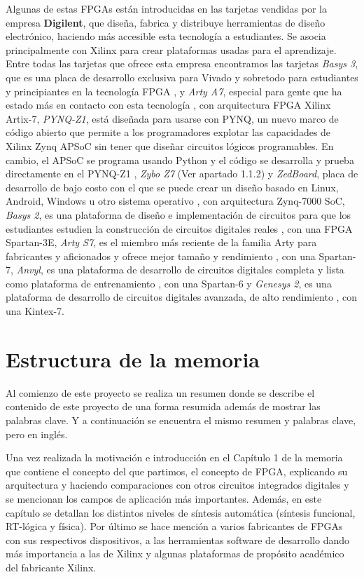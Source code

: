 Algunas de estas FPGAs están introducidas en las tarjetas vendidas por la empresa \textbf{Digilent}, que 
diseña, fabrica y distribuye herramientas de diseño electrónico, haciendo más accesible esta tecnología 
a estudiantes. Se asocia principalmente con Xilinx para crear plataformas usadas para el aprendizaje. Entre todas las 
tarjetas que ofrece esta empresa encontramos las tarjetas \textit{Basys 3}, que es una placa de desarrollo exclusiva para Vivado y sobretodo para 
estudiantes y principiantes en la tecnología FPGA \cite{basys}, y \textit{Arty A7}, especial para gente que ha estado más en contacto con esta tecnología \cite{arty}, 
con arquitectura FPGA Xilinx Artix-7, \textit{PYNQ-Z1}, está diseñada para usarse con PYNQ, un nuevo marco de código abierto que permite a los programadores explotar las 
capacidades de Xilinx Zynq APSoC sin tener que diseñar circuitos lógicos programables. En cambio, el APSoC se programa usando Python y el código se desarrolla y prueba 
directamente en el PYNQ-Z1 \cite{pynq1}, \textit{Zybo Z7} (Ver apartado 1.1.2) y \textit{ZedBoard}, placa de desarrollo de bajo costo con el que se puede crear 
un diseño basado en Linux, Android, Windows u otro sistema operativo \cite{zed}, con arquitectura Zynq-7000 SoC, \textit{Basys 2}, es una plataforma de diseño e 
implementación de circuitos para que los estudiantes estudien la construcción de circuitos digitales reales \cite{basys2}, con una FPGA Spartan-3E, 
\textit{Arty S7}, es el miembro más reciente de la familia Arty para fabricantes y aficionados y ofrece mejor tamaño y rendimiento \cite{artys7}, 
con una Spartan-7, \textit{Anvyl}, es una plataforma de desarrollo de circuitos digitales completa y lista como plataforma de entrenamiento \cite{Anvyl}, 
con una Spartan-6 y \textit{Genesys 2}, es una plataforma de desarrollo de circuitos digitales avanzada, de alto rendimiento \cite{genesys}, con una Kintex-7. 

\section{Estructura de la memoria} 

Al comienzo de este proyecto se realiza un resumen donde se describe el contenido de este proyecto de una forma resumida además 
de mostrar las palabras clave. Y a continuación se encuentra el mismo resumen y palabras clave, pero en inglés.

Una vez realizada la motivación e introducción en el Capítulo 1 de la memoria que contiene el concepto del que partimos, el concepto de FPGA, 
explicando su arquitectura y haciendo comparaciones con otros circuitos integrados digitales y se mencionan los campos de aplicación más 
importantes. Además, en este capítulo se detallan los distintos niveles de síntesis automática (síntesis funcional, RT-lógica y física). 
Por último se hace mención a varios fabricantes de FPGAs con sus respectivos dispositivos, a las herramientas software de desarrollo 
dando más importancia a las de Xilinx y algunas plataformas de propósito académico del fabricante Xilinx.

